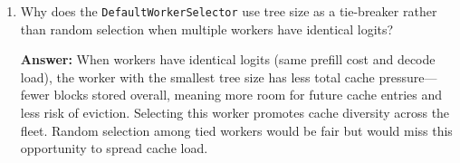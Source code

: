 \begin{enumerate}
  \item Why does the \texttt{DefaultWorkerSelector} use tree size as a tie-breaker rather than random selection when multiple workers have identical logits?

  \textbf{Answer:} When workers have identical logits (same prefill cost and decode load), the worker with the smallest tree size has less total cache pressure---fewer blocks stored overall, meaning more room for future cache entries and less risk of eviction. Selecting this worker promotes cache diversity across the fleet. Random selection among tied workers would be fair but would miss this opportunity to spread cache load.
\end{enumerate}
